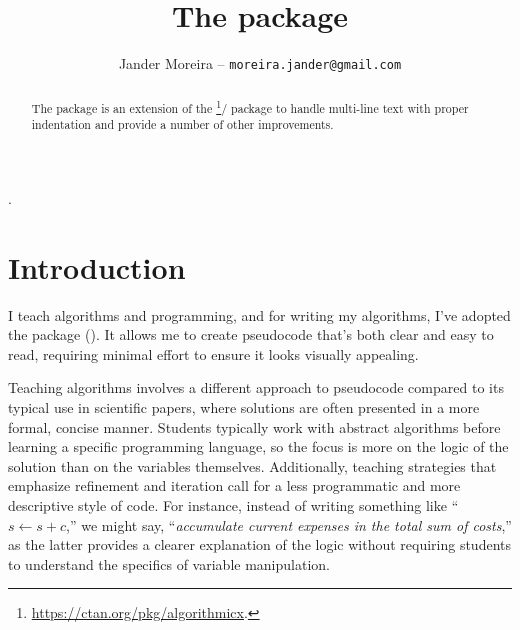 \documentclass[a4paper, 11pt]{article}
\title{%
    The \PackageName{algxpar} package\\\normalsize\AlgVersion
}
\author{Jander Moreira -- \texttt{moreira.jander@gmail.com}}
\date{\AlgDate}
\begin{document}
\maketitle

\begin{abstract}
    The  package is an extension of the \footnote{\url{https://ctan.org/pkg/algorithmicx}.}/ package to handle multi-line text with proper indentation and provide a number of other improvements.
\end{abstract}
\tableofcontents

%
.


\begin{figure}
    \vspace{3em}
\end{figure}

\PDPrintChanges


\section{Introduction}
I teach algorithms and programming, and for writing my algorithms, I've adopted the  package (). It allows me to create pseudocode that's both clear and easy to read, requiring minimal effort to ensure it looks visually appealing.

Teaching algorithms involves a different approach to pseudocode compared to its typical use in scientific papers, where solutions are often presented in a more formal, concise manner. Students typically work with abstract algorithms before learning a specific programming language, so the focus is more on the logic of the solution than on the variables themselves. Additionally, teaching strategies that emphasize refinement and iteration call for a less programmatic and more descriptive style of code. For instance, instead of writing something like ``${s \gets s + c}$,'' we might say, ``\emph{accumulate current expenses in the total sum of costs},'' as the latter provides a clearer explanation of the logic without requiring students to understand the specifics of variable manipulation.
\end{document}
